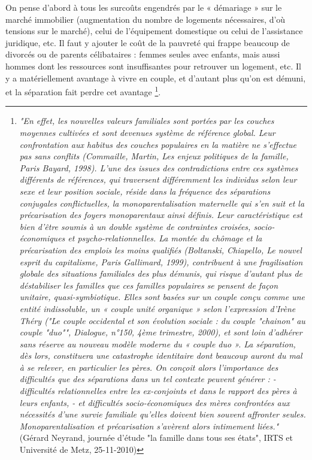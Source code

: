 On pense d'abord à tous les surcoûts engendrés par le « démariage » sur le marché immobilier (augmentation du nombre de logements nécessaires, d'où tensions sur le marché), celui de l'équipement domestique ou celui de l'assistance juridique, etc. Il faut y ajouter le coût de la pauvreté qui frappe beaucoup de divorcés ou de parents célibataires : femmes seules avec enfants, mais aussi hommes dont les ressources sont insuffisantes pour retrouver un logement, etc. Il y a matériellement avantage à vivre en couple, et d'autant plus qu'on est démuni, et la séparation fait perdre cet avantage
\footnote{\emph{"En effet, les nouvelles valeurs familiales sont portées par les couches moyennes cultivées et sont devenues système de référence global. Leur confrontation aux habitus des couches populaires en la matière ne s’effectue pas sans conflits (Commaille, Martin, Les enjeux politiques de la famille, Paris Bayard, 1998). L’une des issues des contradictions entre ces systèmes différents de références, qui traversent différemment les individus selon leur sexe et leur position sociale, réside dans la fréquence des séparations conjugales conflictuelles, la monoparentalisation maternelle qui s’en suit et la précarisation des foyers monoparentaux ainsi définis. Leur caractéristique est bien d’être soumis à un double système de contraintes croisées, socio-économiques et psycho-relationnelles.
La montée du chômage et la précarisation des emplois les moins qualifiés (Boltanski, Chiapello, Le nouvel esprit du capitalisme, Paris Gallimard, 1999), contribuent à une fragilisation globale des situations familiales des plus démunis, qui risque d’autant plus de déstabiliser les familles que ces familles populaires se pensent de façon unitaire, quasi-symbiotique.
Elles sont basées sur un couple conçu comme une entité indissoluble, un « couple unité organique » selon l’expression d’Irène Théry ("Le couple occidental et son évolution sociale : du couple "chainon" au couple "duo"", Dialogue, n°150, 4ème trimestre, 2000), et sont loin d’adhérer sans réserve au nouveau modèle moderne du « couple duo ». La séparation, dès lors, constituera une catastrophe identitaire dont beaucoup auront du mal à se relever, en particulier les pères.
On conçoit alors l’importance des difficultés que des séparations dans un tel contexte peuvent générer :
- difficultés relationnelles entre les ex-conjoints et dans le rapport des pères à leurs enfants,
- et difficultés socio-économiques des mères confrontées aux nécessités d’une survie familiale qu’elles doivent bien souvent affronter seules.
Monoparentalisation et précarisation s’avèrent alors intimement liées."} (Gérard Neyrand, journée d'étude "la famille dans tous ses états", IRTS et Université de Metz, 25-11-2010)}.


